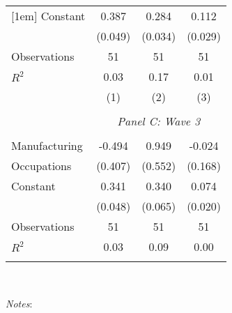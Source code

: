 \begin{table}[!htbp]
\begin{tabular}{@{\extracolsep{5pt}}lccc}
[1em]
Constant            &       0.387\sym{***}&       0.284\sym{***}&       0.112\sym{***}\\
                    &     (0.049)         &     (0.034)         &     (0.029)         \\
[1em]
Observations        &          51         &          51         &          51         \\
\(R^{2}\)           &        0.03         &        0.17         &        0.01         \\
                    &\multicolumn{1}{c}{(1)}         &\multicolumn{1}{c}{(2)}         &\multicolumn{1}{c}{(3)}         \\
\hline \\               & \multicolumn{3}{c}{\textit{Panel C: Wave 3}} \\               \addlinespace[1mm] \\
Manufacturing       &      -0.494         &       0.949\sym{*}  &      -0.024         \\
Occupations         &     (0.407)         &     (0.552)         &     (0.168)         \\
[1em]
Constant            &       0.341\sym{***}&       0.340\sym{***}&       0.074\sym{***}\\
                    &     (0.048)         &     (0.065)         &     (0.020)         \\
[1em]
Observations        &          51         &          51         &          51         \\
\(R^{2}\)           &        0.03         &        0.09         &        0.00         \\
\hline                         \hline                          \hline \\[-1.8ex]                          \end{tabular}                         \\                         \begin{minipage}{1.0 \textwidth}                         {\footnotesize \emph{Notes}:                          \starlanguage}                         \end{minipage}                         \end{table}